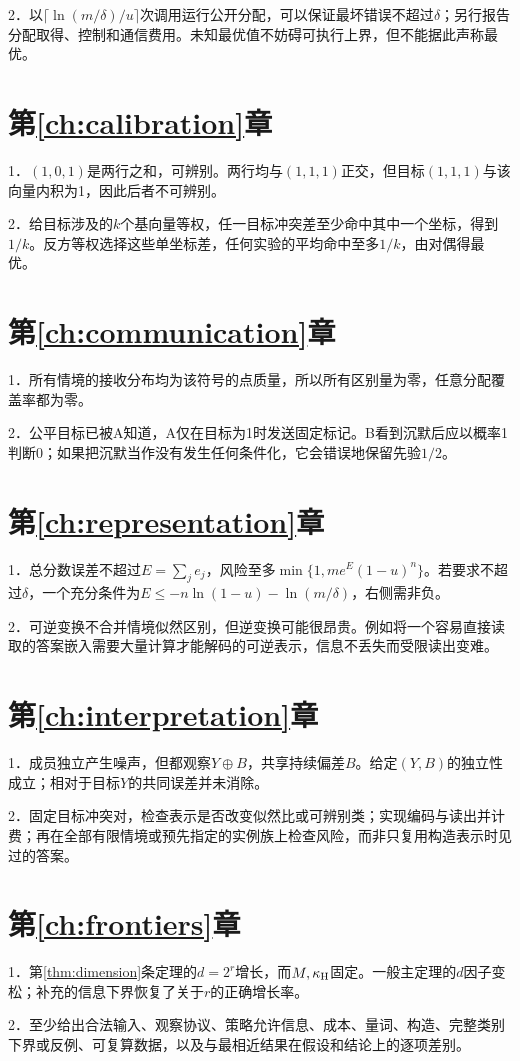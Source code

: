 2．以$\lceil\ln(m/\delta)/u\rceil$次调用运行公开分配，可以保证最坏错误不超过$\delta$；另行报告分配取得、控制和通信费用。未知最优值不妨碍可执行上界，但不能据此声称最优。

\section*{第\ref{ch:calibration}章}
1．$(1,0,1)$是两行之和，可辨别。两行均与$(1,1,1)$正交，但目标$(1,1,1)$与该向量内积为1，因此后者不可辨别。

2．给目标涉及的$k$个基向量等权，任一目标冲突差至少命中其中一个坐标，得到$1/k$。反方等权选择这些单坐标差，任何实验的平均命中至多$1/k$，由对偶得最优。

\section*{第\ref{ch:communication}章}
1．所有情境的接收分布均为该符号的点质量，所以所有区别量为零，任意分配覆盖率都为零。

2．公平目标已被A知道，A仅在目标为1时发送固定标记。B看到沉默后应以概率1判断0；如果把沉默当作没有发生任何条件化，它会错误地保留先验$1/2$。

\section*{第\ref{ch:representation}章}
1．总分数误差不超过$E=\sum_je_j$，风险至多$\min\{1,me^E(1-u)^n\}$。若要求不超过$\delta$，一个充分条件为$E\le-n\ln(1-u)-\ln(m/\delta)$，右侧需非负。

2．可逆变换不合并情境似然区别，但逆变换可能很昂贵。例如将一个容易直接读取的答案嵌入需要大量计算才能解码的可逆表示，信息不丢失而受限读出变难。

\section*{第\ref{ch:interpretation}章}
1．成员独立产生噪声，但都观察$Y\oplus B$，共享持续偏差$B$。给定$(Y,B)$的独立性成立；相对于目标$Y$的共同误差并未消除。

2．固定目标冲突对，检查表示是否改变似然比或可辨别类；实现编码与读出并计费；再在全部有限情境或预先指定的实例族上检查风险，而非只复用构造表示时见过的答案。

\section*{第\ref{ch:frontiers}章}
1．第\ref{thm:dimension}条定理的$d=2^r$增长，而$M,\kappa_{\mathrm H}$固定。一般主定理的$d$因子变松；补充的信息下界恢复了关于$r$的正确增长率。

2．至少给出合法输入、观察协议、策略允许信息、成本、量词、构造、完整类别下界或反例、可复算数据，以及与最相近结果在假设和结论上的逐项差别。
